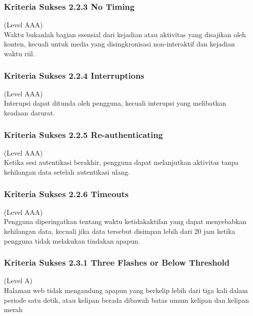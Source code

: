 \subsubsection{Kriteria Sukses 2.2.3 No Timing}
\label{subsubsec:kriteria_2.2.3}
(Level AAA) \\

Waktu bukanlah bagian esensial dari kejadian atau aktivitas yang disajikan oleh konten, kecuali untuk media yang disingkronisasi non-interaktif dan kejadian waktu riil.

\subsubsection{Kriteria Sukses 2.2.4 Interruptions}
\label{subsubsec:kriteria_2.2.4}
(Level AAA) \\

Interupsi dapat ditunda oleh pengguna, kecuali interupsi yang melibatkan keadaan darurat.

\subsubsection{Kriteria Sukses 2.2.5 Re-authenticating}
\label{subsubsec:kriteria_2.2.5}
(Level AAA) \\

Ketika sesi autentikasi berakhir, pengguna dapat melanjutkan aktivitas tanpa kehilangan data setelah autentikasi ulang.

\subsubsection{Kriteria Sukses 2.2.6 Timeouts}
\label{subsubsec:kriteria_2.2.6}
(Level AAA) \\

Pengguna diperingatkan tentang waktu ketidakaktifan yang dapat menyebabkan kehilangan data, kecuali jika data tersebut disimpan lebih dari 20 jam ketika pengguna tidak melakukan tindakan apapun.

\subsubsection{Kriteria Sukses 2.3.1 Three Flashes or Below Threshold}
\label{subsubsec:kriteria_2.3.1}
(Level A) \\

Halaman web tidak mengandung apapun yang berkelip lebih dari tiga kali dalam periode satu detik, atau kelipan berada dibawah batas umum kelipan dan kelipan merah


